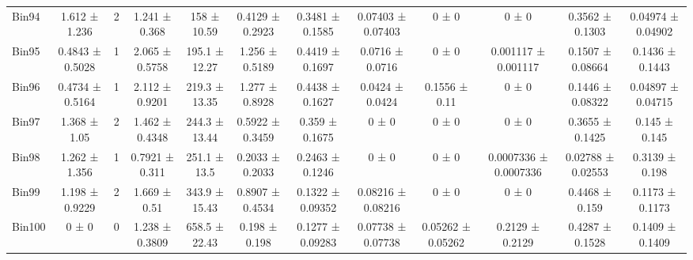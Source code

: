 \begin{tabular}{@{\extracolsep{4pt}}lccccccccccc@{}}
     Bin94 & 1.612 ± 1.236 & 2 & 1.241 ± 0.368 & 158 ± 10.59 & 0.4129 ± 0.2923 & 0.3481 ± 0.1585 & 0.07403 ± 0.07403 & 0 ± 0 & 0 ± 0 & 0.3562 ± 0.1303 & 0.04974 ± 0.04902 \\ 
     Bin95 & 0.4843 ± 0.5028 & 1 & 2.065 ± 0.5758 & 195.1 ± 12.27 & 1.256 ± 0.5189 & 0.4419 ± 0.1697 & 0.0716 ± 0.0716 & 0 ± 0 & 0.001117 ± 0.001117 & 0.1507 ± 0.08664 & 0.1436 ± 0.1443 \\ 
     Bin96 & 0.4734 ± 0.5164 & 1 & 2.112 ± 0.9201 & 219.3 ± 13.35 & 1.277 ± 0.8928 & 0.4438 ± 0.1627 & 0.0424 ± 0.0424 & 0.1556 ± 0.11 & 0 ± 0 & 0.1446 ± 0.08322 & 0.04897 ± 0.04715 \\ 
     Bin97 & 1.368 ± 1.05 & 2 & 1.462 ± 0.4348 & 244.3 ± 13.44 & 0.5922 ± 0.3459 & 0.359 ± 0.1675 & 0 ± 0 & 0 ± 0 & 0 ± 0 & 0.3655 ± 0.1425 & 0.145 ± 0.145 \\ 
     Bin98 & 1.262 ± 1.356 & 1 & 0.7921 ± 0.311 & 251.1 ± 13.5 & 0.2033 ± 0.2033 & 0.2463 ± 0.1246 & 0 ± 0 & 0 ± 0 & 0.0007336 ± 0.0007336 & 0.02788 ± 0.02553 & 0.3139 ± 0.198 \\ 
     Bin99 & 1.198 ± 0.9229 & 2 & 1.669 ± 0.51 & 343.9 ± 15.43 & 0.8907 ± 0.4534 & 0.1322 ± 0.09352 & 0.08216 ± 0.08216 & 0 ± 0 & 0 ± 0 & 0.4468 ± 0.159 & 0.1173 ± 0.1173 \\ 
     Bin100 & 0 ± 0 & 0 & 1.238 ± 0.3809 & 658.5 ± 22.43 & 0.198 ± 0.198 & 0.1277 ± 0.09283 & 0.07738 ± 0.07738 & 0.05262 ± 0.05262 & 0.2129 ± 0.2129 & 0.4287 ± 0.1528 & 0.1409 ± 0.1409 \\ 
\hline\hline
  \end{tabular}
